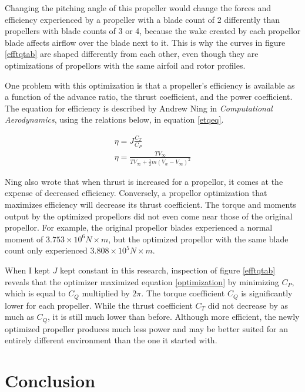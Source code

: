 \documentclass[journal ]{new-aiaa}
\begin{document}
Changing the pitching angle of this propeller would change the forces and efficiency experienced by a propeller with a blade count of 2 differently than propellers with blade counts of 3 or 4, because the wake created by each propellor blade affects airflow over the blade next to it. This is why the curves in figure \ref{efftqtab} are shaped differently from each other, even though they are optimizations of propellors with the same airfoil and rotor profiles.

One problem with this optimization is that a propeller's efficiency is available as a function of the advance ratio, the thrust coefficient, and the power coefficient. The equation for efficiency is described by Andrew Ning in \emph{Computational Aerodynamics},\cite{ComAer} using the relations below, in equation \ref{etqeq}.

\begin{equation}
	\begin{aligned}
	\eta = J \frac{C_{T}}{C_{P}} \\
	\eta = \frac{T V_{\infty}}{T V_{\infty} + \frac{1}{2} \dot{m} (V_{w} - V_{\infty})^{2}}
	\end{aligned}
\label{etqeq}
\end{equation}

Ning also wrote that when thrust is increased for a propellor, it comes at the expense of decreased efficiency.\cite{ComAer} Conversely, a propellor optimization that maximizes efficiency will decrease its thrust coefficient. The torque and moments output by the optimized propellors did not even come near those of the original propellor. For example, the original propellor blades experienced a normal moment of $3.753 \times 10^{6}N \times m$, but the optimized propellor with the same blade count only experienced $3.808 \times 10^{5} N \times m$.

When I kept $J$ kept constant in this research, inspection of figure \ref{efftqtab} reveals that the optimizer maximized equation \ref{optimization} by minimizing $C_{P}$, which is equal to $C_{Q}$ multiplied by $2 \pi$. The torque coefficient $C_{Q}$ is significantly lower for each propeller. While the thrust coefficient $C_{T}$ did not decrease by as much as $C_{Q}$, it is still much lower than before. Although more efficient, the newly optimized propeller produces much less power and may be better suited for an entirely different environment than the one it started with.


\section{Conclusion}
\end{document}
